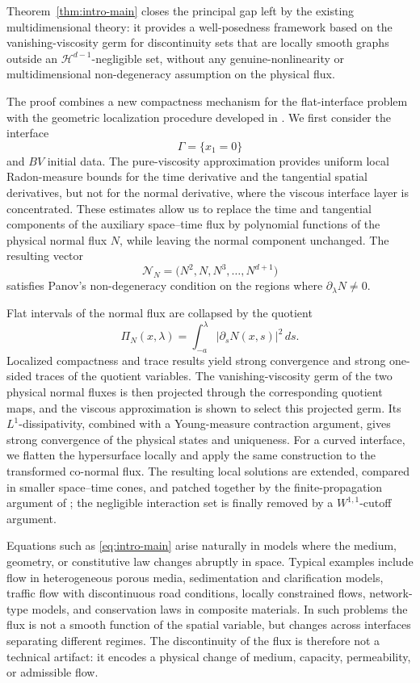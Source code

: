 \documentclass[11pt]{amsart}
\numberwithin{equation}{section}
\theoremstyle{plain}
\theoremstyle{definition}
\theoremstyle{remark}
\begin{document}
Theorem~\ref{thm:intro-main} closes the principal gap left by the existing
multidimensional theory: it provides a well-posedness framework based on the
vanishing-viscosity germ for discontinuity sets that are locally smooth graphs
outside an \(\mathcal H^{d-1}\)-negligible set, without any
genuine-nonlinearity or multidimensional non-degeneracy assumption on the
physical flux.

The proof combines a new compactness mechanism for the flat-interface problem
with the geometric localization procedure developed in
\cite{Mitrovic2025Nondegenerate}. We first consider the interface
\[
    \Gamma=\{x_1=0\}
\]
and \(BV\) initial data. The pure-viscosity approximation provides uniform
local Radon-measure bounds for the time derivative and the tangential spatial
derivatives, but not for the normal derivative, where the viscous interface
layer is concentrated. These estimates allow us to replace the time and
tangential components of the auxiliary space--time flux by polynomial
functions of the physical normal flux \(N\), while leaving the normal
component unchanged. The resulting vector
\[
    \mathcal N_N
    =
    \bigl(
        N^2,N,N^3,\ldots,N^{d+1}
    \bigr)
\]
satisfies Panov's non-degeneracy condition on the regions where
\(\partial_\lambda N\neq0\).

Flat intervals of the normal flux are collapsed by the quotient
\[
    \Pi_N(x,\lambda)
    =
    \int_{-a}^{\lambda}
        |\partial_sN(x,s)|^2\,ds.
\]
Localized compactness and trace results yield strong convergence and strong
one-sided traces of the quotient variables. The vanishing-viscosity germ of
the two physical normal fluxes is then projected through the corresponding
quotient maps, and the viscous approximation is shown to select this projected
germ. Its \(L^1\)-dissipativity, combined with a Young-measure contraction
argument, gives strong convergence of the physical states and uniqueness.
For a curved interface, we flatten the hypersurface locally and apply the
same construction to the transformed co-normal flux. The resulting local
solutions are extended, compared in smaller space--time cones, and patched
together by the finite-propagation argument of
\cite{Mitrovic2025Nondegenerate}; the negligible interaction set is finally
removed by a \(W^{1,1}\)-cutoff argument.


Equations such as \eqref{eq:intro-main} arise naturally in models where the
medium, geometry, or constitutive law changes abruptly in space. Typical
examples include flow in heterogeneous porous media, sedimentation and
clarification models, traffic flow with discontinuous road conditions, locally
constrained flows, network-type models, and conservation laws in composite
materials. In such problems the flux is not a smooth function of the spatial
variable, but changes across interfaces separating different regimes. The
discontinuity of the flux is therefore not a technical artifact: it encodes a
physical change of medium, capacity, permeability, or admissible flow.
\end{document}
